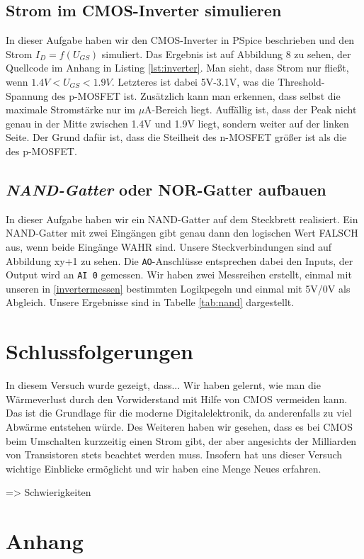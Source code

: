 \documentclass[12pt,a4paper]{scrartcl}
\begin{document}
\subsection{Strom im CMOS-Inverter simulieren}
In dieser Aufgabe haben wir den CMOS-Inverter in PSpice beschrieben und den Strom $I_D=f(U_{GS})$ simuliert.
Das Ergebnis ist auf Abbildung 8 zu sehen, der Quellcode im Anhang in Listing \ref{lst:inverter}.
Man sieht, dass Strom nur flie\ss t, wenn $1.4V < U_{GS} < 1.9V$.
Letzteres ist dabei 5V-3.1V, was die Threshold-Spannung des p-MOSFET ist.
Zus\"atzlich kann man erkennen, dass selbst die maximale Stromst\"arke nur im $\mu$A-Bereich liegt.
Auff\"allig ist, dass der Peak nicht genau in der Mitte zwischen 1.4V und 1.9V liegt, sondern weiter auf der linken Seite.
Der Grund daf\"ur ist, dass die Steilheit des n-MOSFET gr\"o\ss er ist als die des p-MOSFET.

\subsection{\emph{NAND-Gatter} oder NOR-Gatter aufbauen}
In dieser Aufgabe haben wir ein NAND-Gatter auf dem Steckbrett realisiert.
Ein NAND-Gatter mit zwei Eing\"angen gibt genau dann den logischen Wert FALSCH aus, wenn beide Eing\"ange WAHR sind.
Unsere Steckverbindungen sind auf Abbildung xy+1 zu sehen.
Die \texttt{AO}-Anschl\"usse entsprechen dabei den Inputs, der Output wird an \texttt{AI 0} gemessen.
Wir haben zwei Messreihen erstellt, einmal mit unseren in \ref{invertermessen} bestimmten Logikpegeln und einmal mit 5V/0V als Abgleich.
Unsere Ergebnisse sind in Tabelle \ref{tab:nand} dargestellt.

\section{Schlussfolgerungen}
In diesem Versuch wurde gezeigt, dass...
Wir haben gelernt, wie man die W\"armeverlust durch den Vorwiderstand mit Hilfe von CMOS vermeiden kann.
Das ist die Grundlage f\"ur die moderne Digitalelektronik, da anderenfalls zu viel Abw\"arme entstehen w\"urde.
Des Weiteren haben wir gesehen, dass es bei CMOS beim Umschalten kurzzeitig einen Strom gibt, der aber angesichts der Milliarden von Transistoren stets beachtet werden muss.
Insofern hat uns dieser Versuch wichtige Einblicke erm\"oglicht und wir haben eine Menge Neues erfahren.

=> Schwierigkeiten

\section{Anhang}


\end{document}
